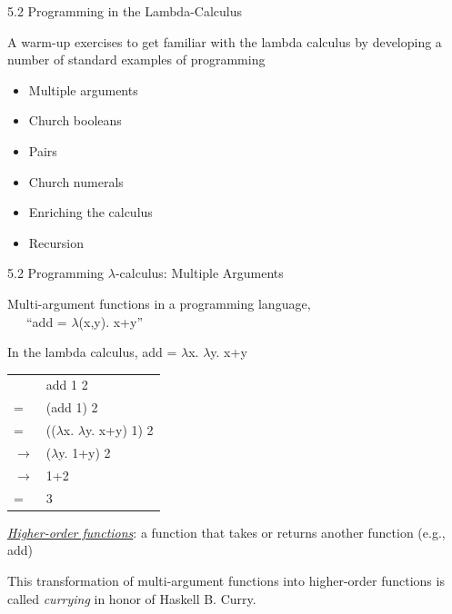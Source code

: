 \documentclass[table]{beamer}
\begin{document}
\begin{frame}[t]{5.2 Programming in the Lambda-Calculus}

A warm-up exercises to get familiar with the lambda calculus by developing a number of standard examples of programming

\begin{itemize}
\item Multiple arguments
\item Church booleans
\item Pairs
\item Church numerals
\item Enriching the calculus
\item Recursion
\end{itemize}

\end{frame}


\begin{frame}[t]{5.2 Programming $\lambda$-calculus: Multiple Arguments} 

Multi-argument functions in a programming language, \\
 \ \ \ ``add = $\lambda$(x,y). x+y''

\vspace{10pt}

In the lambda calculus,  add = $\lambda$x. $\lambda$y. x+y 

\vspace{3pt}

\begin{tabular}{l l}
    & add 1 2 \\
 =  & (add 1) 2 \\    
 =  & (($\lambda$x. $\lambda$y. x+y) 1) 2 \\
 $\rightarrow$ & ($\lambda$y. 1+y) 2 \\
 $\rightarrow$ & 1+2  \\ 
 = & 3
\end{tabular}

\vspace{10pt}

\underline{\it Higher-order functions}: a function that takes or returns another function (e.g., add)

\vspace{10pt}

This transformation of multi-argument functions into higher-order functions is called {\it currying} in honor of Haskell B. Curry.

\end{frame}
\end{document}
